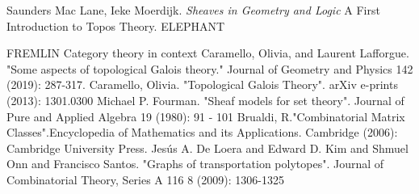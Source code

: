 \documentclass[a4paper]{amsproc}
\theoremstyle{plain}
\theoremstyle{definition}
\theoremstyle{remark}
\numberwithin{equation}{section}
\begin{document}
\begin{thebibliography}{9}
Saunders Mac Lane, Ieke Moerdijk. \textit{Sheaves in Geometry and Logic} A First Introduction to Topos Theory.
ELEPHANT

FREMLIN
Category theory in context
Caramello, Olivia, and Laurent Lafforgue. "Some aspects of topological Galois theory." Journal of Geometry and Physics 142 (2019): 287-317.
 Caramello, Olivia. "Topological Galois Theory". arXiv e-prints (2013):  1301.0300
Michael P. Fourman. "Sheaf models for set theory". Journal of Pure and Applied Algebra 19 (1980): 91 - 101
Brualdi, R."Combinatorial Matrix Classes".Encyclopedia of Mathematics and its Applications. Cambridge  (2006): Cambridge University Press.
 Jesús A. De Loera and Edward D. Kim and Shmuel Onn and Francisco Santos. "Graphs of transportation polytopes". Journal of Combinatorial Theory, Series A 116 8 (2009): 1306-1325
\end{thebibliography}
\end{document}
